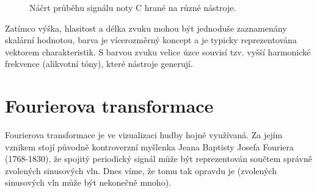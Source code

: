 \documentclass[thesis=B, czech]{FITthesis}[2019/03/06]
\let\oldquote\quote
\let\endoldquote\endquote
\renewenvironment{quote}[2][]
  {\if\relax\detokenize{#1}\relax
     \def\quoteauthor{#2}%
   \else
     \def\quoteauthor{#2~---~#1}%
   \fi
   \oldquote}
  {\par\nobreak\smallskip\hfill(\quoteauthor)%
   \endoldquote\addvspace{\bigskipamount}}
\begin{document}



\begin{figure}[h]
\def\svgwidth{0.65\textwidth}
    \centering
    
        \caption{Náčrt průběhu signálu noty C hrané na různé nástroje.}
    \label{fig:tebr}
\end{figure}

 Zatímco výška, hlasitost a délka zvuku mohou být jednoduše zaznamenány skalární hodnotou, barva je vícerozměrný koncept a je typicky reprezentována vektorem charakteristik. S barvou zvuku velice úzce souvisí tzv. vyšší harmonické frekvence (alikvotní tóny), které nástroje generují.


\newpage

\section{Fourierova transformace} \label{fourier}




\par


Fourierova transformace je ve vizualizaci hudby hojně využívaná. Za jejím vznikem stojí původně kontroverzní myšlenka Jeana Baptisty Josefa Fouriera (1768-1830), že spojitý periodický signál může být reprezentován součtem správně zvolených sinusových vln. Dnes víme, že tomu tak opravdu je (zvolených sinusových vln může být nekonečně mnoho).
\end{document}
